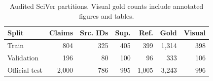 \begin{table}[t]
\centering
\caption{Audited SciVer partitions. Visual gold counts include annotated figures and tables.}
\label{tab:data-audit}
\scriptsize
\setlength{\tabcolsep}{2.5pt}
\begin{tabular}{@{}lrrrrrr@{}}
\toprule
Split & Claims & Src. IDs & Sup. & Ref. & Gold & Visual \\
\midrule
Train & 804 & 325 & 405 & 399 & 1,314 & 398 \\
Validation & 196 & 80 & 100 & 96 & 333 & 106 \\
Official test & 2,000 & 786 & 995 & 1,005 & 3,243 & 996 \\
\bottomrule
\end{tabular}
\end{table}
